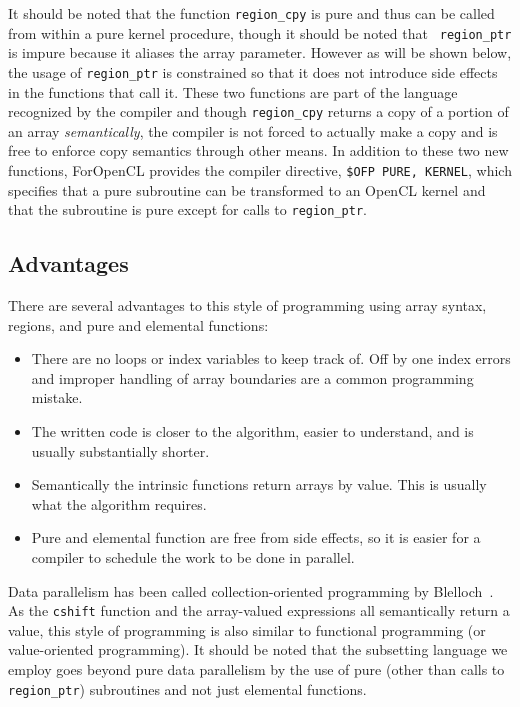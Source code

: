 It should be noted that the function {\tt region\_cpy} is pure and thus can be
called from within a pure kernel procedure, though it should be noted that {\tt
region\_ptr} is impure because it aliases the array parameter.  However as will
be shown below, the usage of {\tt region\_ptr} is constrained so that it does not
introduce side effects in the functions that call it.  These two functions are
part of the language recognized by the compiler and though {\tt region\_cpy}
returns a copy of a portion of an array \emph{semantically}, the compiler is not
forced to actually make a copy and is free to enforce copy semantics through
other means.  In addition to these two new functions, ForOpenCL provides the
compiler directive, {\tt \!\$OFP PURE, KERNEL}, which specifies that a pure subroutine
can be transformed to an OpenCL kernel and that the subroutine is pure
except for calls to {\tt region\_ptr}.

\subsection{Advantages}

There are several advantages to this style of programming using array
syntax, regions, and pure and elemental functions:

\begin{itemize}
\item There are no loops or index variables to keep track of.  Off by
  one index errors and improper handling of array boundaries are a
  common programming mistake.
\item The written code is closer to the algorithm, easier to
  understand, and is usually substantially shorter.
\item Semantically the intrinsic functions return arrays by value.
  This is usually what the algorithm requires.
\item Pure and elemental function are free from side effects, so it is
  easier for a compiler to schedule the work to be done in parallel.
\end{itemize}

Data parallelism has been called collection-oriented programming by
Blelloch~\cite{blelloch90}.  As the {\tt cshift} function and the array-valued
expressions all semantically return a value, this style of programming is also
similar to functional programming (or value-oriented programming).  It should be
noted that the subsetting language we employ goes beyond pure data parallelism
by the use of pure (other than calls to {\tt region\_ptr}) subroutines and
not just elemental functions.

